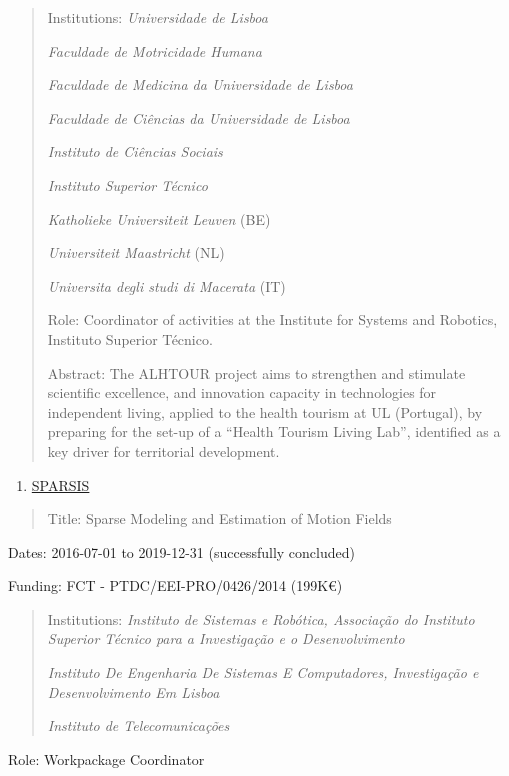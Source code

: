 \documentclass[
]{article}
\begin{document}
\begin{quote}
Institutions: \emph{Universidade de Lisboa}

\emph{Faculdade de Motricidade Humana}

\emph{Faculdade de Medicina da Universidade de Lisboa}

\emph{Faculdade de Ciências da Universidade de Lisboa}

\emph{Instituto de Ciências Sociais}

\emph{Instituto Superior Técnico}

\emph{Katholieke Universiteit Leuven} (BE)

\emph{Universiteit Maastricht} (NL)

\emph{Universita degli studi di Macerata} (IT)

Role: Coordinator of activities at the Institute for Systems and
Robotics, Instituto Superior Técnico.

Abstract: The ALHTOUR project aims to strengthen and stimulate
scientific excellence, and innovation capacity in technologies for
independent living, applied to the health tourism at UL (Portugal), by
preparing for the set-up of a ``Health Tourism Living Lab'', identified
as a key driver for territorial development.
\end{quote}

\begin{enumerate}
\def\labelenumi{\arabic{enumi}.}
\setcounter{enumi}{6}
\item
  \ul{SPARSIS}
\end{enumerate}

\begin{quote}
Title: Sparse Modeling and Estimation of Motion Fields
\end{quote}

Dates: 2016-07-01 to 2019-12-31 (successfully concluded)

Funding: FCT - PTDC/EEI-PRO/0426/2014 (199K€)

\begin{quote}
Institutions: \emph{Instituto de Sistemas e Robótica, Associação do
Instituto Superior Técnico para a Investigação e o Desenvolvimento}

\emph{Instituto De Engenharia De Sistemas E Computadores, Investigação e
Desenvolvimento Em Lisboa}

\emph{Instituto de Telecomunicações}
\end{quote}

Role: Workpackage Coordinator
\end{document}
